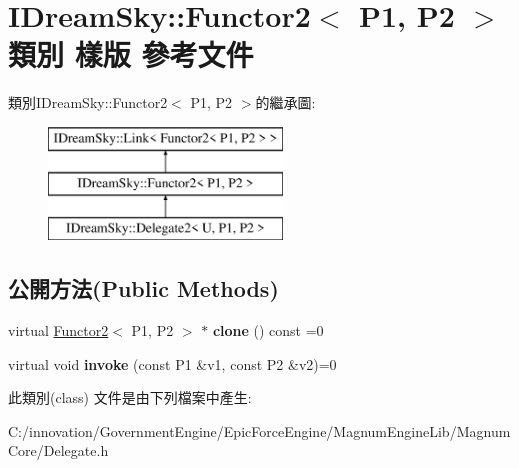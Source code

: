 \hypertarget{class_i_dream_sky_1_1_functor2}{}\section{I\+Dream\+Sky\+:\+:Functor2$<$ P1, P2 $>$ 類別 樣版 參考文件}
\label{class_i_dream_sky_1_1_functor2}
類別\+I\+Dream\+Sky\+:\+:Functor2$<$ P1, P2 $>$的繼承圖\+:\begin{figure}[H]
\begin{center}
\leavevmode
\includegraphics[height=3.000000cm]{class_i_dream_sky_1_1_functor2}
\end{center}
\end{figure}
\subsection*{公開方法(Public Methods)}
\begin{DoxyCompactItemize}
\item 
virtual \hyperlink{class_i_dream_sky_1_1_functor2}{Functor2}$<$ P1, P2 $>$ $\ast$ {\bfseries clone} () const  =0\hypertarget{class_i_dream_sky_1_1_functor2_aff3e38f6bc73abfd51c8ba73ee0c942c}{}\label{class_i_dream_sky_1_1_functor2_aff3e38f6bc73abfd51c8ba73ee0c942c}

\item 
virtual void {\bfseries invoke} (const P1 \&v1, const P2 \&v2)=0\hypertarget{class_i_dream_sky_1_1_functor2_af282983cee47ecdc244e386bdca99209}{}\label{class_i_dream_sky_1_1_functor2_af282983cee47ecdc244e386bdca99209}

\end{DoxyCompactItemize}


此類別(class) 文件是由下列檔案中產生\+:\begin{DoxyCompactItemize}
\item 
C\+:/innovation/\+Government\+Engine/\+Epic\+Force\+Engine/\+Magnum\+Engine\+Lib/\+Magnum\+Core/Delegate.\+h\end{DoxyCompactItemize}
